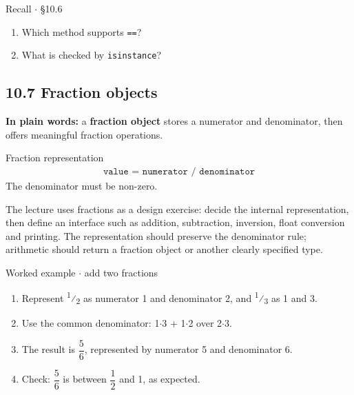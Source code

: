 \documentclass[11pt]{article}
\begin{document}
\begin{keepsection}
\begin{recallbox}{Recall \ensuremath{\cdot} §10.6}
\begin{enumerate}
\item Which method supports \texttt{==}?
\item What is checked by \texttt{isinstance}?
\end{enumerate}

\end{recallbox}
\end{keepsection}

\begin{keepsection}
\section{10.7 Fraction objects}

\begin{plainbox}\textbf{In plain words:} a \textbf{fraction object} stores a numerator and denominator, then offers meaningful fraction operations.\end{plainbox}

\begin{equationcard}{Fraction representation}
\[ \begin{gathered} \texttt{value = numerator / denominator} \end{gathered} \]
{\small The denominator must be non-zero.}
\end{equationcard}

The lecture uses fractions as a design exercise: decide the internal representation, then define an interface such as addition, subtraction, inversion, float conversion and printing. The representation should preserve the denominator rule; arithmetic should return a fraction object or another clearly specified type.

\begin{workedbox}{Worked example \ensuremath{\cdot} add two fractions}
\begin{enumerate}
\item Represent \textsuperscript{1}⁄\textsubscript{2} as numerator 1 and denominator 2, and \textsuperscript{1}⁄\textsubscript{3} as 1 and 3.
\item Use the common denominator: 1\ensuremath{\cdot}3 + 1\ensuremath{\cdot}2 over 2\ensuremath{\cdot}3.
\item The result is {\small\ensuremath{\dfrac{5}{6}}}, represented by numerator 5 and denominator 6.
\item Check: {\small\ensuremath{\dfrac{5}{6}}} is between {\small\ensuremath{\dfrac{1}{2}}} and 1, as expected.
\end{enumerate}
\end{workedbox}


\end{keepsection}
\end{document}
